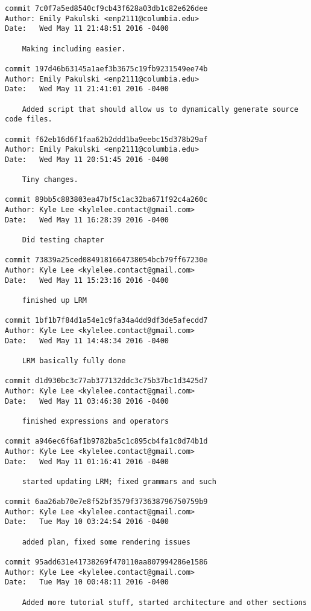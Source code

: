     \begin{lstlisting}[backgroundcolor=\color{white}]
commit 7c0f7a5ed8540cf9cb43f628a03db1c82e626dee
Author: Emily Pakulski <enp2111@columbia.edu>
Date:   Wed May 11 21:48:51 2016 -0400

    Making including easier.

commit 197d46b63145a1aef3b3675c19fb9231549ee74b
Author: Emily Pakulski <enp2111@columbia.edu>
Date:   Wed May 11 21:41:01 2016 -0400

    Added script that should allow us to dynamically generate source code files.

commit f62eb16d6f1faa62b2ddd1ba9eebc15d378b29af
Author: Emily Pakulski <enp2111@columbia.edu>
Date:   Wed May 11 20:51:45 2016 -0400

    Tiny changes.

commit 89bb5c883803ea47bf5c1ac32ba671f92c4a260c
Author: Kyle Lee <kylelee.contact@gmail.com>
Date:   Wed May 11 16:28:39 2016 -0400

    Did testing chapter

commit 73839a25ced0849181664738054bcb79ff67230e
Author: Kyle Lee <kylelee.contact@gmail.com>
Date:   Wed May 11 15:23:16 2016 -0400

    finished up LRM

commit 1bf1b7f84d1a54e1c9fa34a4dd9df3de5afecdd7
Author: Kyle Lee <kylelee.contact@gmail.com>
Date:   Wed May 11 14:48:34 2016 -0400

    LRM basically fully done

commit d1d930bc3c77ab377132ddc3c75b37bc1d3425d7
Author: Kyle Lee <kylelee.contact@gmail.com>
Date:   Wed May 11 03:46:38 2016 -0400

    finished expressions and operators

commit a946ec6f6af1b9782ba5c1c895cb4fa1c0d74b1d
Author: Kyle Lee <kylelee.contact@gmail.com>
Date:   Wed May 11 01:16:41 2016 -0400

    started updating LRM; fixed grammars and such

commit 6aa26ab70e7e8f52bf3579f373638796750759b9
Author: Kyle Lee <kylelee.contact@gmail.com>
Date:   Tue May 10 03:24:54 2016 -0400

    added plan, fixed some rendering issues

commit 95add631e41738269f470110aa807994286e1586
Author: Kyle Lee <kylelee.contact@gmail.com>
Date:   Tue May 10 00:48:11 2016 -0400

    Added more tutorial stuff, started architecture and other sections


\end{lstlisting}

